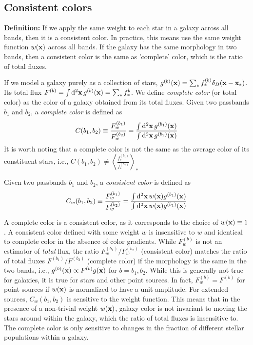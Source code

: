 \subsection{Consistent colors}
\textbf{Definition:} If we apply the same weight to each star in a galaxy across all bands, then it is a consistent color.
In practice, this means use the same weight function $w({\bf x})$ across all bands.
If the galaxy has the same morphology in two bands, then a consistent color is the same as 'complete' color,
which is the ratio of total fluxes.

If we model a galaxy purely as a collection of stars, $g^{(b)}({\bf x}) = \sum_* f^{(b)}_*\delta_D({\bf x}-{\bf x}_*)$.
Its total flux $F^{(b)} = \int\mathrm{d}^2{\bf x}\, g^{(b)}({\bf x}) = \sum_* f^{b}_*$.
We define \emph{complete color} (or total color) as the color of a galaxy obtained from its total fluxes.
Given two passbands $b_1$ and $b_2$, a \emph{complete color} is defined as
\begin{equation}
  C(b_1,b_2) \equiv \frac{F^{(b_1)}_w}{F^{(b_2)}_w} = \frac{\int\mathrm{d}^2{\bf x}\, g^{(b_1)}({\bf x})}{\int\mathrm{d}^2{\bf x}\, g^{(b_2)}({\bf x})}
\end{equation}
It is worth noting that a complete color is not the same as the average color of its constituent stars, i.e.,
$C(b_1,b_2) \ne \left\langle \frac{f^{(b_1)}_*}{f^{(b_2)}_*} \right\rangle_*$

Given two passbands $b_1$ and $b_2$, a \emph{consistent color} is defined as
\begin{equation}
  C_w(b_1, b_2) \equiv \frac{F^{(b_1)}_w}{F^{(b_2)}_w} = \frac{\int\mathrm{d}^2{\bf x}\,w({\bf x}) g^{(b_1)}({\bf x})}{\int\mathrm{d}^2{\bf x}\,w({\bf x}) g^{(b_1)}({\bf x})}
\end{equation}

A complete color is a consistent color, as it corresponds to the choice of $w({\bf x}) \equiv 1$.
A consistent color defined with some weight $w$ is insensitive to $w$ and identical to complete color in the absence of color gradients.
While $F^{(b)}_w$ is not an estimator of \emph{total} flux, the ratio ${F^{(b_1)}_w}/{F^{(b_2)}_w}$ (consistent color) matches the ratio of total fluxes ${F^{(b_1)}}/{F^{(b_2)}}$ (complete color)
if the morphology is the same in the two bands, i.e., $g^{(b)}({\bf x}) \propto F^{(b)} g({\bf x})$ for $b=b_1,b_2$.
While this is generally not true for galaxies, it is true for stars and other point sources.
In fact, $F^{(b)}_w = F^{(b)}$ for point sources if $w({\bf x})$ is normalized to have a unit amplitude.
For extended sources, $C_w(b_1, b_2)$ is sensitive to the
weight function. This means that in the presence of a non-trivial weight $w({\bf x})$, galaxy color is not invariant to moving the stars around within the galaxy, which the ratio of total fluxes is insensitive to. The complete color is only sensitive to changes in the fraction of different stellar populations within a galaxy.

